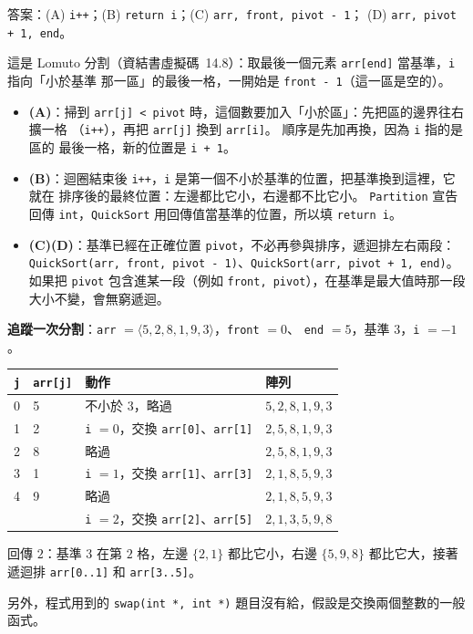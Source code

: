 \begin{pastsoln}
答案：(A) \texttt{i++}；(B) \texttt{return i}；(C) \texttt{arr, front, pivot - 1}；
(D) \texttt{arr, pivot + 1, end}。

這是 Lomuto 分割（資結書虛擬碼~14.8）：取最後一個元素 \texttt{arr[end]} 當基準，\texttt{i} 指向「小於基準
那一區」的最後一格，一開始是 \texttt{front - 1}（這一區是空的）。
\begin{itemize}
\item \textbf{(A)}：掃到 \texttt{arr[j] < pivot} 時，這個數要加入「小於區」：先把區的邊界往右擴一格
（\texttt{i++}），再把 \texttt{arr[j]} 換到 \texttt{arr[i]}。 順序是先加再換，因為 \texttt{i} 指的是區的
最後一格，新的位置是 \texttt{i + 1}。
\item \textbf{(B)}：迴圈結束後 \texttt{i++}，\texttt{i} 是第一個不小於基準的位置，把基準換到這裡，它就在
排序後的最終位置：左邊都比它小，右邊都不比它小。 \texttt{Partition} 宣告回傳 \texttt{int}，\texttt{QuickSort}
用回傳值當基準的位置，所以填 \texttt{return i}。
\item \textbf{(C)(D)}：基準已經在正確位置 \texttt{pivot}，不必再參與排序，遞迴排左右兩段：
\texttt{QuickSort(arr, front, pivot - 1)}、\texttt{QuickSort(arr, pivot + 1, end)}。 如果把 \texttt{pivot}
包含進某一段（例如 \texttt{front, pivot}），在基準是最大值時那一段大小不變，會無窮遞迴。
\end{itemize}

\textbf{追蹤一次分割}：\texttt{arr} $= \langle 5, 2, 8, 1, 9, 3\rangle$，\texttt{front} $= 0$、
\texttt{end} $= 5$，基準 $3$，\texttt{i} $= -1$。
\begin{center}
\begin{tabular}{clll}
\toprule
\texttt{j} & \texttt{arr[j]} & 動作 & 陣列 \\
\midrule
0 & 5 & 不小於 $3$，略過 & $5, 2, 8, 1, 9, 3$ \\
1 & 2 & \texttt{i} $= 0$，交換 \texttt{arr[0]}、\texttt{arr[1]} & $2, 5, 8, 1, 9, 3$ \\
2 & 8 & 略過 & $2, 5, 8, 1, 9, 3$ \\
3 & 1 & \texttt{i} $= 1$，交換 \texttt{arr[1]}、\texttt{arr[3]} & $2, 1, 8, 5, 9, 3$ \\
4 & 9 & 略過 & $2, 1, 8, 5, 9, 3$ \\
\midrule
 & & \texttt{i} $= 2$，交換 \texttt{arr[2]}、\texttt{arr[5]} & $2, 1, 3, 5, 9, 8$ \\
\bottomrule
\end{tabular}
\end{center}
回傳 $2$：基準 $3$ 在第 $2$ 格，左邊 $\{2, 1\}$ 都比它小，右邊 $\{5, 9, 8\}$ 都比它大，接著遞迴排
\texttt{arr[0..1]} 和 \texttt{arr[3..5]}。

另外，程式用到的 \texttt{swap(int *, int *)} 題目沒有給，假設是交換兩個整數的一般函式。
\end{pastsoln}
